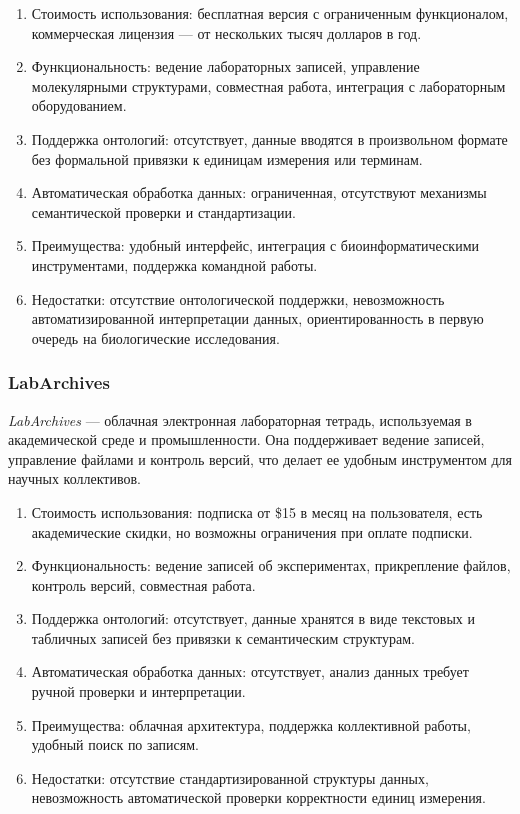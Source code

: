 
\begin{enumerate}
    \item Стоимость использования: бесплатная версия с ограниченным функционалом, коммерческая лицензия — от нескольких тысяч долларов в год.
    \item Функциональность: ведение лабораторных записей, управление молекулярными структурами, совместная работа, интеграция с лабораторным оборудованием.
    \item Поддержка онтологий: отсутствует, данные вводятся в произвольном формате без формальной привязки к единицам измерения или терминам.
    \item Автоматическая обработка данных: ограниченная, отсутствуют механизмы семантической проверки и стандартизации.
    \item Преимущества: удобный интерфейс, интеграция с биоинформатическими инструментами, поддержка командной работы.
    \item Недостатки: отсутствие онтологической поддержки, невозможность автоматизированной интерпретации данных, ориентированность в первую очередь на биологические исследования.
\end{enumerate}

\subsubsection{LabArchives}

\textit{LabArchives}\cite{ELN:LabArchives} — облачная электронная лабораторная тетрадь, используемая в академической среде и промышленности. Она поддерживает ведение записей, управление файлами и контроль версий, что делает ее удобным инструментом для научных коллективов.


\begin{enumerate}
    \item Стоимость использования: подписка от \$15 в месяц на пользователя, есть академические скидки, но возможны ограничения при оплате подписки.
    \item Функциональность: ведение записей об экспериментах, прикрепление файлов, контроль версий, совместная работа.
    \item Поддержка онтологий: отсутствует, данные хранятся в виде текстовых и табличных записей без привязки к семантическим структурам.
    \item Автоматическая обработка данных: отсутствует, анализ данных требует ручной проверки и интерпретации.
    \item Преимущества: облачная архитектура, поддержка коллективной работы, удобный поиск по записям.
    \item Недостатки: отсутствие стандартизированной структуры данных, невозможность автоматической проверки корректности единиц измерения.
\end{enumerate}

